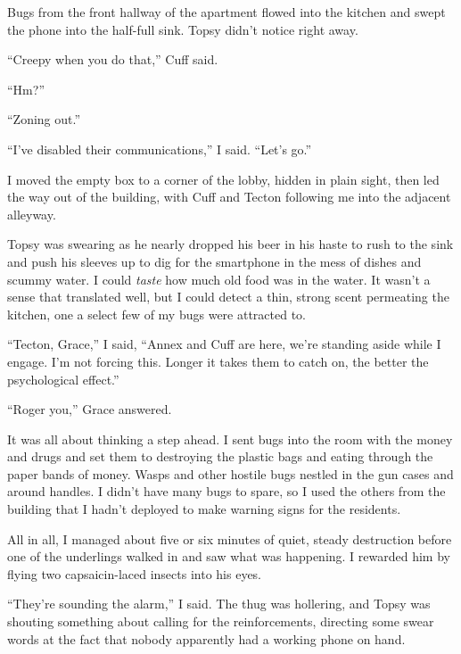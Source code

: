 Bugs from the front hallway of the apartment flowed into the kitchen and swept the phone into the half-full sink.  Topsy didn't notice right away.



``Creepy when you do that,'' Cuff said.



``Hm?''



``Zoning out.''



``I've disabled their communications,'' I said.  ``Let's go.''



I moved the empty box to a corner of the lobby, hidden in plain sight, then led the way out of the building, with Cuff and Tecton following me into the adjacent alleyway.



Topsy was swearing as he nearly dropped his beer in his haste to rush to the sink and push his sleeves up to dig for the smartphone in the mess of dishes and scummy water.  I could \emph{taste} how much old food was in the water.  It wasn't a sense that translated well, but I could detect a thin, strong scent permeating the kitchen, one a select few of my bugs were attracted to.



``Tecton, Grace,'' I said, ``Annex and Cuff are here, we're standing aside while I engage.  I'm not forcing this.  Longer it takes them to catch on, the better the psychological effect.''



``Roger you,'' Grace answered.



It was all about thinking a step ahead.  I sent bugs into the room with the money and drugs and set them to destroying the plastic bags and eating through the paper bands of money.  Wasps and other hostile bugs nestled in the gun cases and around handles.  I didn't have many bugs to spare, so I used the others from the building that I hadn't deployed to make warning signs for the residents.



All in all, I managed about five or six minutes of quiet, steady destruction before one of the underlings walked in and saw what was happening.  I rewarded him by flying two capsaicin-laced insects into his eyes.



``They're sounding the alarm,'' I said.  The thug was hollering, and Topsy was shouting something about calling for the reinforcements, directing some swear words at the fact that nobody apparently had a working phone on hand.



